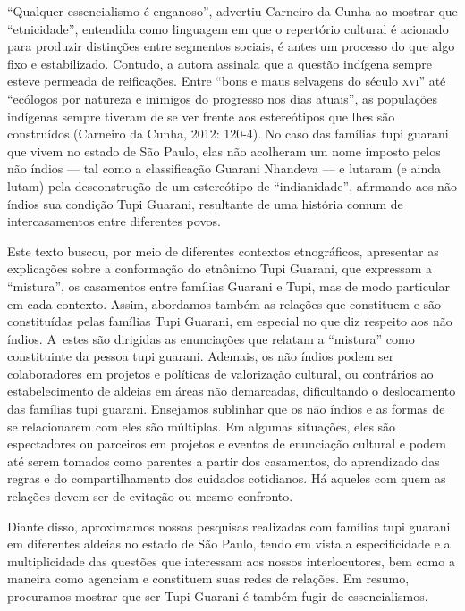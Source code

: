``Qualquer essencialismo é enganoso'', advertiu Carneiro da Cunha ao
mostrar que ``etnicidade'', entendida como linguagem em que o repertório
cultural é acionado para produzir distinções entre segmentos sociais, é
antes um processo do que algo fixo e estabilizado. Contudo, a autora
assinala que a questão indígena sempre esteve permeada de reificações.
Entre ``bons e maus selvagens do século \textsc{xvi}'' até ``ecólogos por natureza
e inimigos do progresso nos dias atuais'', as populações indígenas
sempre tiveram de se ver frente aos estereótipos que lhes são
construídos (Carneiro da Cunha, 2012: 120-4). No caso das famílias tupi
guarani que vivem no estado de São Paulo, elas não acolheram um nome
imposto pelos não índios --- tal como a classificação Guarani Nhandeva ---
e lutaram (e ainda lutam) pela desconstrução de um estereótipo de
``indianidade'', afirmando aos não índios sua condição Tupi Guarani,
resultante de uma história comum de intercasamentos entre diferentes
povos. 

Este texto buscou, por meio de diferentes contextos etnográficos,
apresentar as explicações sobre a conformação do etnônimo Tupi Guarani,
que expressam a ``mistura'', os casamentos entre famílias Guarani e Tupi,
mas de modo particular em cada contexto. Assim, abordamos também as
relações que constituem e são constituídas pelas famílias Tupi Guarani,
em especial no que diz respeito aos não índios. A~estes são dirigidas
as enunciações que relatam a ``mistura'' como constituinte da pessoa tupi
guarani. Ademais, os não índios podem ser colaboradores em projetos e
políticas de valorização cultural, ou contrários ao estabelecimento de
aldeias em áreas não demarcadas, dificultando o deslocamento das
famílias tupi guarani. Ensejamos sublinhar que os não índios e as
formas de se relacionarem com eles são múltiplas. Em algumas situações,
eles são espectadores ou parceiros em projetos e eventos de enunciação
cultural e podem até serem tomados como parentes a partir dos
casamentos, do aprendizado das regras e do compartilhamento dos
cuidados cotidianos. Há aqueles com quem as relações devem ser de
evitação ou mesmo confronto.

Diante disso, aproximamos nossas pesquisas realizadas com famílias tupi
guarani em diferentes aldeias no estado de São Paulo, tendo em vista a
especificidade e a multiplicidade das questões que interessam aos
nossos interlocutores, bem como a maneira como agenciam e constituem
suas redes de relações. Em resumo, procuramos mostrar que ser Tupi
Guarani é também fugir de essencialismos.

